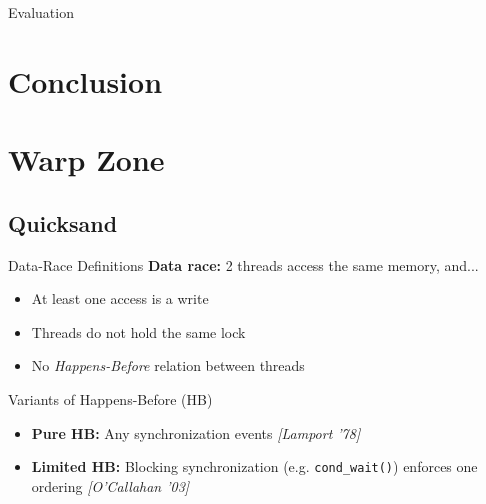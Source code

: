 \documentclass[xcolor=dvipsnames]{beamer}
\begin{document}
\begin{frame}{Evaluation}
\end{frame}


\section{Conclusion}



\section{Warp Zone}

\subsection{Quicksand}

\begin{frame}{Data-Race Definitions}
	\textbf{Data race:} 2 threads access the same memory, and...
	\begin{itemize}
		\item At least one access is a write
		\item Threads do not hold the same lock
		\item No {\em Happens-Before} relation between threads
	\end{itemize}
	\pause
	\linegap

	Variants of Happens-Before (HB)
	\begin{itemize}
		\item {\bf Pure HB:} Any synchronization events {\em [Lamport '78]}
		\item {\bf Limited HB:} Blocking synchronization (e.g. \texttt{cond\_wait()}) enforces one ordering {\em [O'Callahan '03]}
	\end{itemize}
\end{frame}
\end{document}
